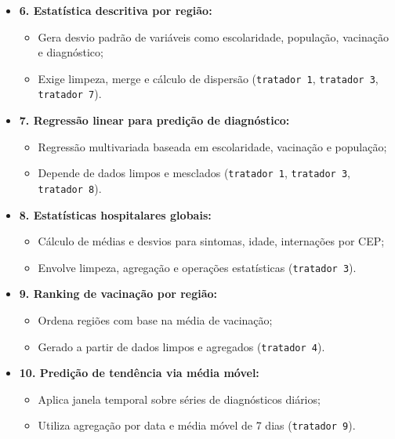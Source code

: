 \documentclass[a4paper,12pt]{article}
\begin{document}
\begin{itemize}
    \item \textbf{6. Estatística descritiva por região:}
    \begin{itemize}
        \item Gera desvio padrão de variáveis como escolaridade, população, vacinação e diagnóstico;
        \item Exige limpeza, merge e cálculo de dispersão (\texttt{tratador 1}, \texttt{tratador 3}, \texttt{tratador 7}).
    \end{itemize}

    \item \textbf{7. Regressão linear para predição de diagnóstico:}
    \begin{itemize}
        \item Regressão multivariada baseada em escolaridade, vacinação e população;
        \item Depende de dados limpos e mesclados (\texttt{tratador 1}, \texttt{tratador 3}, \texttt{tratador 8}).
    \end{itemize}

    \item \textbf{8. Estatísticas hospitalares globais:}
    \begin{itemize}
        \item Cálculo de médias e desvios para sintomas, idade, internações por CEP;
        \item Envolve limpeza, agregação e operações estatísticas (\texttt{tratador 3}).
    \end{itemize}

    \item \textbf{9. Ranking de vacinação por região:}
    \begin{itemize}
        \item Ordena regiões com base na média de vacinação;
        \item Gerado a partir de dados limpos e agregados (\texttt{tratador 4}).
    \end{itemize}

    \item \textbf{10. Predição de tendência via média móvel:}
    \begin{itemize}
        \item Aplica janela temporal sobre séries de diagnósticos diários;
        \item Utiliza agregação por data e média móvel de 7 dias (\texttt{tratador 9}).
    \end{itemize}
\end{itemize}
\end{document}
